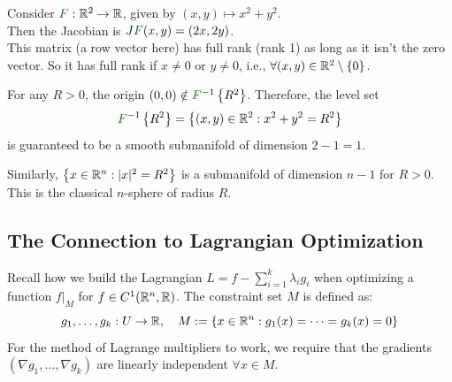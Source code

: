 \begin{example*}
Consider $\textcolor{eDarkGreen}{F}: \R^2 \to \R$, given by $(x,y) \mapsto x^2 + y^2$. \\
Then the Jacobian is $J\textcolor{eDarkGreen}{F}(x,y) = (2x, 2y)$. \\
This matrix (a row vector here) has full rank (rank 1) as long as it isn't the zero vector. So it has full rank if $x \ne 0$ or $y \ne 0$, i.e., $\forall (x,y) \in \mathbb{R}^2 \setminus \left\{ 0 \right\}$.

For any $R > 0$, the origin $(0,0) \notin \textcolor{eDarkGreen}{F}^{-1}\set{R^2}$. Therefore, the level set
\[ \textcolor{eDarkGreen}{F}^{-1}\set{R^2} = \set{(x,y) \in \R^2 : x^2 + y^2 = R^2} \]
is guaranteed to be a smooth submanifold of dimension $2 - 1 = 1$.

\begin{center}
\end{center}

Similarly, $\left\{ x \in \mathbb{R}^n : \lvert x\rvert^2 = R^2 \right\}$ is a submanifold of dimension $n-1$ for $R > 0$. \\
\textcolor{eGray}{This is the classical $n$-sphere of radius $R$.} 
\end{example*}

\subsection*{The Connection to Lagrangian Optimization}

Recall how we build the Lagrangian $L = f - \sum_{i=1}^k \lambda_i g_i$ when optimizing a function $f|_M$ for $f \in C^1(\mathbb{R}^n, \mathbb{R})$. The constraint set $M$ is defined as:
\[ g_1, \dots, g_k: U \to \mathbb{R}, \quad M := \left\{ x \in \mathbb{R}^n : g_1(x) = \dots = g_k(x) = 0 \right\} \]
For the method of Lagrange multipliers to work, we require that the gradients $(\nabla g_1, \dots, \nabla g_k)$ are linearly independent $\forall x \in M$.

